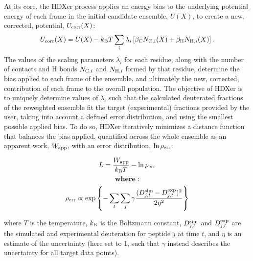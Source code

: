 \documentclass[9pt,tutorial]{livecoms}
\begin{document}
At its core, the HDXer process applies an energy bias to the underlying potential energy of each frame in the initial candidate ensemble, $U(X)$, to create a new, corrected, potential, $U_{\textnormal{corr}}(X)$:
\begin{equation}\label{Ucorr_eqn}
    U_{\textnormal{corr}}(X) = U(X) -k_\textnormal{B}T\sum_{i} \lambda_i \left[ \beta_\textnormal{C} N_{\textnormal{C},i}(X) + \beta_\textnormal{H} N_{\textnormal{H},i}(X) \right].
\end{equation}
The values of the scaling parameters $\lambda_i$ for each residue, along with the number of contacts and H bonds $N_{\textnormal{C},i}$ and $N_{\textnormal{H},i}$ formed by that residue, determine the bias applied to each frame of the ensemble, and ultimately the new, corrected, contribution of each frame to the overall population.
The objective of HDXer is to uniquely determine values of $\lambda_i$ such that the calculated deuterated fractions of the reweighted ensemble fit the target (experimental) fractions provided by the user, taking into account a defined error distribution, and using the smallest possible applied bias.
To do so, HDXer iteratively minimizes a distance function that balances the bias applied, quantified across the whole ensemble as an apparent work, $W_\textnormal{app}$, with an error distribution, $\ln{\rho_\textnormal{err}}$:

\begin{equation}\label{KL_eqn}
\begin{gathered}
L = \frac{W_\textnormal{app}}{k_\textnormal{B}T} - \ln{\rho_\textnormal{err}} \\
\textbf{where}: \\
\rho_\textnormal{err} \propto \exp{ \left\{ - \sum_t \sum_j \gamma \frac{(D_{j,t}^\textnormal{sim} - D_{j,t}^\textnormal{exp})^2}{2\eta^2} \right\} } 
\end{gathered}
\end{equation}

where $T$ is the temperature, $k_\textnormal{B}$ is the Boltzmann constant, $D_{j,t}^\textnormal{sim}$ and $D_{j,t}^\textnormal{exp}$ are the simulated and experimental deuteration for peptide $j$ at time $t$, and $\eta$ is an estimate of the uncertainty (here set to 1, such that $\gamma$ instead describes the uncertainty for all target data points).
\end{document}
